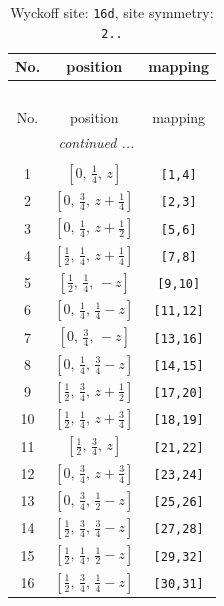 \documentclass[fleqn,8pt]{jsarticle}
\begin{document}
\renewcommand{\arraystretch}{1.2}
\begin{longtable}{ccc}
\caption{Wyckoff site: {\tt 16d}, site symmetry: {\tt 2..}}
 \\
 \hline \hline
No. & position & mapping \\ \hline \endfirsthead

\multicolumn{2}{l}{\tablename\ \thetable{}} \\
 \hline \hline
No. & position & mapping \\ \hline \endhead

 \hline \hline
\multicolumn{2}{r}{\footnotesize\it continued ...} \\ \endfoot

 \hline \hline
\multicolumn{2}{r}{} \\ \endlastfoot

1 & $\left[ 0,\, \frac{1}{4},\, z \right]$ & {\tt [1,4]} \\ \hline
2 & $\left[ 0,\, \frac{3}{4},\, z + \frac{1}{4} \right]$ & {\tt [2,3]} \\ \hline
3 & $\left[ 0,\, \frac{1}{4},\, z + \frac{1}{2} \right]$ & {\tt [5,6]} \\ \hline
4 & $\left[ \frac{1}{2},\, \frac{1}{4},\, z + \frac{1}{4} \right]$ & {\tt [7,8]} \\ \hline
5 & $\left[ \frac{1}{2},\, \frac{1}{4},\, - z \right]$ & {\tt [9,10]} \\ \hline
6 & $\left[ 0,\, \frac{1}{4},\, \frac{1}{4} - z \right]$ & {\tt [11,12]} \\ \hline
7 & $\left[ 0,\, \frac{3}{4},\, - z \right]$ & {\tt [13,16]} \\ \hline
8 & $\left[ 0,\, \frac{1}{4},\, \frac{3}{4} - z \right]$ & {\tt [14,15]} \\ \hline
9 & $\left[ \frac{1}{2},\, \frac{3}{4},\, z + \frac{1}{2} \right]$ & {\tt [17,20]} \\ \hline
10 & $\left[ \frac{1}{2},\, \frac{1}{4},\, z + \frac{3}{4} \right]$ & {\tt [18,19]} \\ \hline
11 & $\left[ \frac{1}{2},\, \frac{3}{4},\, z \right]$ & {\tt [21,22]} \\ \hline
12 & $\left[ 0,\, \frac{3}{4},\, z + \frac{3}{4} \right]$ & {\tt [23,24]} \\ \hline
13 & $\left[ 0,\, \frac{3}{4},\, \frac{1}{2} - z \right]$ & {\tt [25,26]} \\ \hline
14 & $\left[ \frac{1}{2},\, \frac{3}{4},\, \frac{3}{4} - z \right]$ & {\tt [27,28]} \\ \hline
15 & $\left[ \frac{1}{2},\, \frac{1}{4},\, \frac{1}{2} - z \right]$ & {\tt [29,32]} \\ \hline
16 & $\left[ \frac{1}{2},\, \frac{3}{4},\, \frac{1}{4} - z \right]$ & {\tt [30,31]} \\
\end{longtable}
\end{document}
